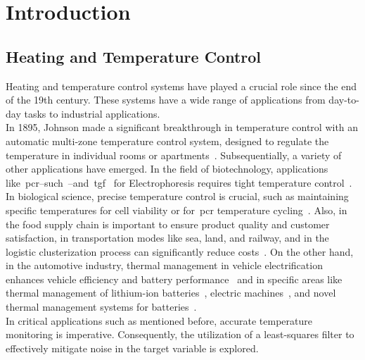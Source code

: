 \section{Introduction}

\subsection{Heating and Temperature Control}
Heating and temperature control systems have played a crucial role since the end of the 19th century. These systems have a wide range of applications from day-to-day tasks to industrial applications. \\

In 1895, Johnson made a significant breakthrough in temperature control with an automatic multi-zone temperature control system, designed to regulate the temperature in individual rooms or apartments~\cite{us542733s}. Subsequentially, a variety of other applications have emerged. In the field of biotechnology, applications like~\acrfull{pcr}--such~\cite{MULLIS1987335, saiki1988, Bartlett2003, C6LC00984K, maltezos2010, mcknight2000, B208405H, hua2010multiplexed, mahjoob2008rapid, dinca2009fast, lien2009microfluidic, qiu2010large, hsieh2008enhancement, shen2005microchip, wang2009miniaturized}--and~\acrfull{tgf}~\cite{matsui2007temperature, ross2002microfluidic} for Electrophoresis requires tight temperature control~\cite{diagnostics3010033}. In biological science, precise temperature control is crucial, such as maintaining specific temperatures for cell viability or for~\acrshort{pcr} temperature cycling~\cite{diagnostics3010033, hung2005microfluid}. Also, in the food supply chain is important to ensure product quality and customer satisfaction, in transportation modes like sea, land, and railway, and in the logistic clusterization process can significantly reduce costs~\cite{baskutis2015temp}. On the other hand, in the automotive industry, thermal management in vehicle electrification enhances vehicle efficiency and battery performance~\cite{casals2016sustainability, previati2022thermal} and in specific areas like thermal management of lithium-ion batteries~\cite{karimi2013thermal}, electric machines~\cite{yang2017thermal}, and novel thermal management systems for batteries~\cite{al2018review}. \\

In critical applications such as mentioned before, accurate temperature monitoring is imperative. Consequently, the utilization of a least-squares filter to effectively mitigate noise in the target variable is explored.



